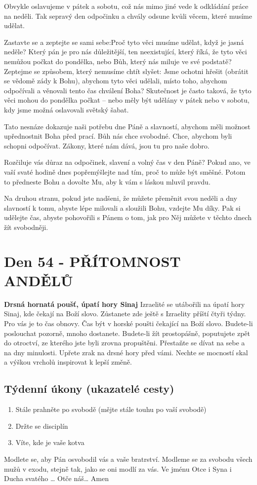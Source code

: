 \documentclass[11pt]{article}
\newcommand{\zacatekOsmyTyden}{
  \textbf{Drsná hornatá poušť, úpatí hory Sinaj} \newline 
  Izraelité se utábořili na úpatí hory Sinaj, kde čekají na Boží slovo. Zůstanete zde ještě s Izraelity příští čtyři týdny. Pro vás je to čas obnovy. Čas být v horské poušti čekající na Boží slovo. Budete-li poslouchat pozorně, mnoho dostanete. Budete-li žít prostopášně, poputujete zpět do otroctví, ze kterého jste byli zrovna propuštěni. Přestaňte se dívat na sebe a na dny minulosti. Upřete zrak na drsné hory před vámi. Nechte se mocností skal a výškou vrcholů inspirovat k lepší změně.
  \subsection*{Týdenní úkony (ukazatelé cesty)}
\begin{enumerate}
  \item Stále prahněte po svobodě (mějte stále touhu po vaší svobodě)
  \item Držte se disciplín
  \item Víte, kde je vaše kotva
\end{enumerate}
Modlete se, aby Pán osvobodil vás a vaše bratrství. \newline
Modleme se za svobodu všech mužů v exodu, stejně tak, jako se oni modlí za vás.\newline
Ve jménu Otce i Syna i Ducha svatého …  Otče náš… Amen
}
\begin{document}
Obvykle oslavujeme v pátek a sobotu, což nás mimo jiné vede k odkládání práce na neděli. Tak sepravý den
odpočinku a chvály odsune kvůli věcem, které musíme udělat.

Zastavte se a zeptejte se sami sebe:Proč tyto věci musíme udělat, když je jasná neděle? Který pán je pro nás
důležitější, ten neexistující, který říká, že tyto věci nemůžou počkat do pondělka, nebo Bůh, který nás miluje
ve své podstatě? Zeptejme se způsobem, který nemusíme chtít slyšet: Jsme ochotni hřešit (obrátit se vědomě
zády k Bohu), abychom tyto věci udělali, místo toho, abychom odpočívali a věnovali tento čas chválení
Boha? Skutečnost je často taková, že tyto věci mohou do pondělka počkat – nebo měly být udělány v pátek
nebo v sobotu, kdy jsme možná oslavovali světský šabat.

Tato nesnáze dokazuje naši potřebu dne Páně a slavností, abychom měli možnost upřednostnit Boha před
prací. Bůh nás chce svobodné. Chce, abychom byli schopni odpočívat. Zákony, které nám dává, jsou tu pro
naše dobro.

Rozčiluje vás důraz na odpočinek, slavení a volný čas v den Páně? Pokud ano, ve vaší svaté hodině dnes
popřemýšlejte nad tím, proč to může být směšné. Potom to předneste Bohu a dovolte Mu, aby k vám s láskou
mluvil pravdu.

Na druhou stranu, pokud jste nadšeni, že můžete přeměnit svou neděli a dny slavností k tomu, abyste lépe
milovali a sloužili Bohu, vzdejte Mu díky. Pak si udělejte čas, abyste pohovořili s Pánem o tom, jak pro Něj
můžete v těchto dnech žít svobodněji.

\newpage
\section{Den 54 - PŘÍTOMNOST ANDĚLŮ  }
\zacatekOsmyTyden
\end{document}
